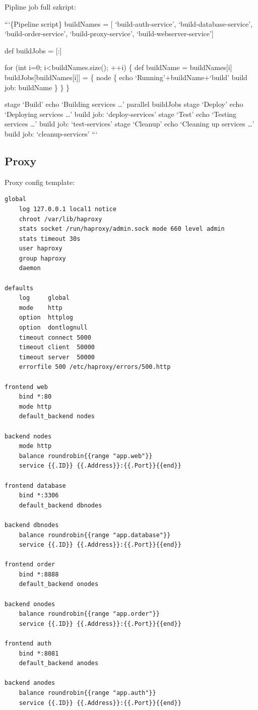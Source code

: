 \documentclass[11pt,magyar,a4paper,twoside,]{report}
\begin{document}
Pipline job full szkript:

```\{Pipeline script\} buildNames = {[} `build-auth-service',
`build-database-service', `build-order-service', `build-proxy-service',
`build-webserver-service'{]}

def buildJobs = {[}:{]}

for (int i=0; i\textless{}buildNames.size(); ++i) \{ def buildName =
buildNames{[}i{]} buildJobs{[}buildNames{[}i{]}{]} = \{ node \{ echo
`Running'+buildName+`build' build job: buildName \} \} \}

stage `Build' echo `Building services \ldots{}' parallel buildJobs stage
`Deploy' echo `Deploying services \ldots{}' build job: `deploy-services'
stage `Test' echo `Testing services \ldots{}' build job: `test-services'
stage `Cleanup' echo `Cleaning up services \ldots{}' build job:
`cleanup-services' ```

\subsection{\texorpdfstring{Proxy\label{appendix-template}}{Proxy}}\label{proxy-1}

Proxy config template:

\begin{verbatim}
global
    log 127.0.0.1 local1 notice
    chroot /var/lib/haproxy
    stats socket /run/haproxy/admin.sock mode 660 level admin
    stats timeout 30s
    user haproxy
    group haproxy
    daemon

defaults
    log     global
    mode    http
    option  httplog
    option  dontlognull
    timeout connect 5000
    timeout client  50000
    timeout server  50000
    errorfile 500 /etc/haproxy/errors/500.http

frontend web
    bind *:80
    mode http
    default_backend nodes

backend nodes
    mode http
    balance roundrobin{{range "app.web"}}
    service {{.ID}} {{.Address}}:{{.Port}}{{end}}

frontend database
    bind *:3306
    default_backend dbnodes

backend dbnodes
    balance roundrobin{{range "app.database"}}
    service {{.ID}} {{.Address}}:{{.Port}}{{end}}

frontend order
    bind *:8888
    default_backend onodes

backend onodes
    balance roundrobin{{range "app.order"}}
    service {{.ID}} {{.Address}}:{{.Port}}{{end}}

frontend auth
    bind *:8081
    default_backend anodes

backend anodes
    balance roundrobin{{range "app.auth"}}
    service {{.ID}} {{.Address}}:{{.Port}}{{end}}
\end{verbatim}
\end{document}
